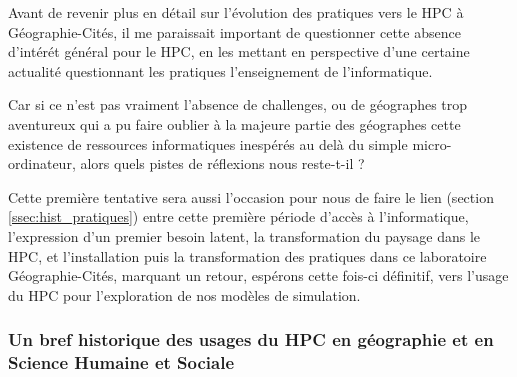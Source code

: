 

Avant de revenir plus en détail sur l'évolution des pratiques vers le HPC à Géographie-Cités, il me paraissait important de questionner cette absence d'intérét général pour le HPC, en les mettant en perspective d'une certaine actualité questionnant les pratiques l'enseignement de l'informatique.

Car si ce n'est pas vraiment l'absence de challenges, ou de géographes trop aventureux qui a pu faire oublier à la majeure partie des géographes cette existence de ressources informatiques inespérés au delà du simple micro-ordinateur, alors quels pistes de réflexions nous reste-t-il  ?

Cette première tentative sera aussi l'occasion pour nous de faire le lien (section \ref{ssec:hist_pratiques}) entre cette première période d'accès à l'informatique, l'expression d'un premier besoin latent, la transformation du paysage dans le HPC, et l'installation puis la transformation des pratiques dans ce laboratoire Géographie-Cités, marquant un retour, espérons cette fois-ci définitif, vers l'usage du HPC pour l'exploration de nos modèles de simulation.

\subsubsection{Un bref historique des usages du HPC en géographie et en Science Humaine et Sociale}
\label{sssec:histo_centrecalcul}


